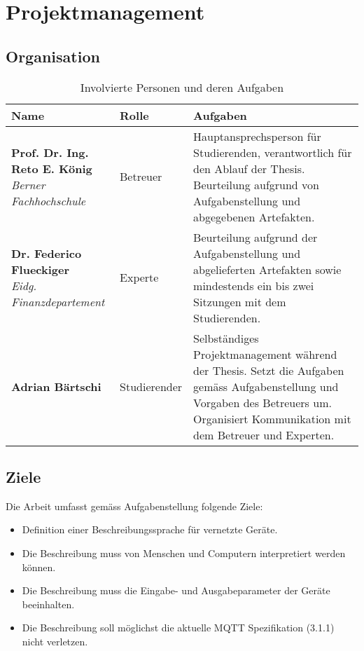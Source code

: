 \chapter{Projektmanagement}
\label{chap:projectmanagement}

\section{Organisation}

\begin{table}[H]
\begin{tabularx}{\textwidth}{|l|l|X|}

 \hline \rowcolor{lightgray}
 {\bf Name } & {\bf Rolle } & {\bf Aufgaben} \\  \hline
  \parbox[t]{5cm}{\textbf{Prof. Dr. Ing. Reto E. König} \\ \textit{Berner Fachhochschule}}  &   Betreuer  &
  Hauptansprechsperson für Studierenden, verantwortlich für den Ablauf der Thesis. Beurteilung aufgrund von Aufgabenstellung und abgegebenen Artefakten.   \\
 \hline
  \parbox[t]{5cm}{\textbf{Dr. Federico Flueckiger} \\ \textit{Eidg.  Finanzdepartement}} &   Experte     &
  Beurteilung aufgrund der Aufgabenstellung und abgelieferten Artefakten sowie mindestends ein bis zwei Sitzungen mit dem Studierenden. \\ 
\hline
 \textbf{Adrian Bärtschi}                &   Studierender   &     
 Selbständiges Projektmanagement während der Thesis. Setzt die Aufgaben gemäss Aufgabenstellung und Vorgaben des Betreuers um. Organisiert Kommunikation mit dem Betreuer und Experten.   \\
 \hline


\end{tabularx}
\caption{Involvierte Personen und deren Aufgaben}
\end{table}


\section{Ziele}
Die Arbeit umfasst gemäss Aufgabenstellung folgende Ziele:
\begin{itemize}
    \item Definition einer Beschreibungssprache für vernetzte Geräte.
    \item Die Beschreibung muss von Menschen und Computern interpretiert werden können.
    \item Die Beschreibung muss die Eingabe- und Ausgabeparameter der Geräte beeinhalten.
    \item Die Beschreibung soll möglichst die aktuelle MQTT Spezifikation (3.1.1) nicht verletzen.
\end{itemize}

